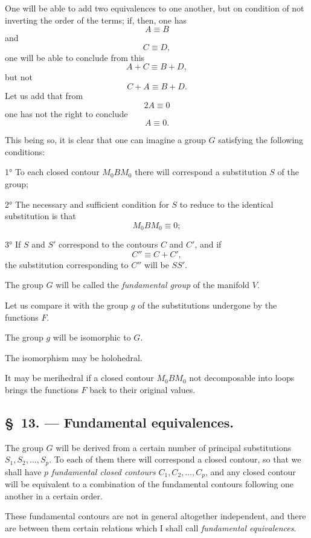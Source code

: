 \documentclass{article}
\begin{document}
One will be able to add two equivalences to one another, but on condition of not inverting the order of the terms; if, then, one has
\[ A \equiv B \]
and
\[ C \equiv D, \]
one will be able to conclude from this
\[ A + C \equiv B + D, \]
but not
\[ C + A \equiv B + D. \]
Let us add that from
\[ 2A \equiv 0 \]
one has not the right to conclude
\[ A \equiv 0. \]

This being so, it is clear that one can imagine a group $G$ satisfying the following conditions:

1° To each closed contour $M_{0}BM_{0}$ there will correspond a substitution $S$ of the group;

2° The necessary and sufficient condition for $S$ to reduce to the identical substitution is that
\[ M_{0}BM_{0} \equiv 0; \]

3° If $S$ and $S'$ correspond to the contours $C$ and $C'$, and if
\[ C'' \equiv C + C', \]
the substitution corresponding to $C''$ will be $SS'$.

The group $G$ will be called the \emph{fundamental group} of the manifold $V$.

Let us compare it with the group $g$ of the substitutions undergone by the functions $F$.

The group $g$ will be isomorphic to $G$.

The isomorphism may be holohedral.

It may be merihedral if a closed contour $M_{0}BM_{0}$ not decomposable into loops brings the functions $F$ back to their original values.

\subsection*{\S~13. --- Fundamental equivalences.}

The group $G$ will be derived from a certain number of principal substitutions
$S_{1}, S_{2}, \ldots, S_{p}$. To each of them there will correspond a closed contour, so that we shall have \emph{$p$ fundamental closed contours} $C_{1}, C_{2}, \ldots, C_{p}$, and any closed contour will be equivalent to a combination of the fundamental contours following one another in a certain order.

These fundamental contours are not in general altogether independent, and there are between them certain relations which I shall call \emph{fundamental equivalences}.
\end{document}
